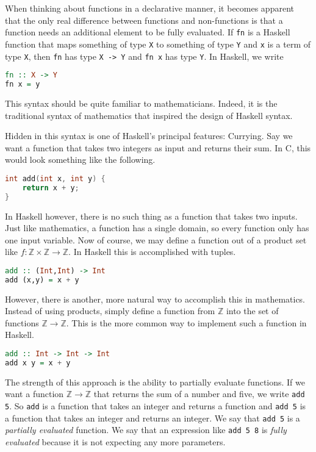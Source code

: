 \documentclass[MS, xcolor=dvipsnames]{wfuthesis}
\def\bZ{\mathbb{Z}}
\theoremstyle{definition}
\begin{document}
When thinking about functions in a declarative manner, it becomes apparent that the only real difference between functions and non-functions is that a function needs an additional element to be fully evaluated. If \lstinline{fn} is a Haskell function that maps something of type \lstinline{X} to something of type \lstinline{Y} and \lstinline{x} is a term of type \lstinline{X}, then \lstinline{fn} has type \lstinline{X -> Y} and \lstinline{fn x} has type \lstinline{Y}. In Haskell, we write 
\begin{lstlisting}[language=Haskell]
fn :: X -> Y
fn x = y
\end{lstlisting}
This syntax should be quite familiar to mathematicians. Indeed, it is the traditional syntax of mathematics that inspired the design of Haskell syntax. \par 
Hidden in this syntax is one of Haskell's principal features: Currying. Say we want a function that takes two integers as input and returns their sum. In C, this would look something like the following.
\begin{lstlisting}[language=C]
int add(int x, int y) {
    return x + y;
}
\end{lstlisting}
In Haskell however, there is no such thing as a function that takes two inputs. Just like mathematics, a function has a single domain, so every function only has one input variable. Now of course, we may define a function out of a product set like $f: \bZ \times \bZ \to \bZ$. In Haskell this is accomplished with tuples.
\begin{lstlisting}[language=Haskell]
add :: (Int,Int) -> Int
add (x,y) = x + y
\end{lstlisting}
However, there is another, more natural way to accomplish this in mathematics. Instead of using products, simply define a function from $\bZ$ into the set of functions $\bZ \to \bZ$. This is the more common way to implement such a function in Haskell.
\begin{lstlisting}[language=Haskell]
add :: Int -> Int -> Int
add x y = x + y
\end{lstlisting}
The strength of this approach is the ability to partially evaluate functions. If we want a function $\bZ \to \bZ$ that returns the sum of a number and five, we write \lstinline{add 5}. So \lstinline{add} is a function that takes an integer and returns a function and \lstinline{add 5} is a function that takes an integer and returns an integer. We say that \lstinline{add 5} is a \emph{partially evaluated} function. We say that an expression like \lstinline{add 5 8} is \emph{fully evaluated} because it is not expecting any more parameters. \par 
\end{document}
